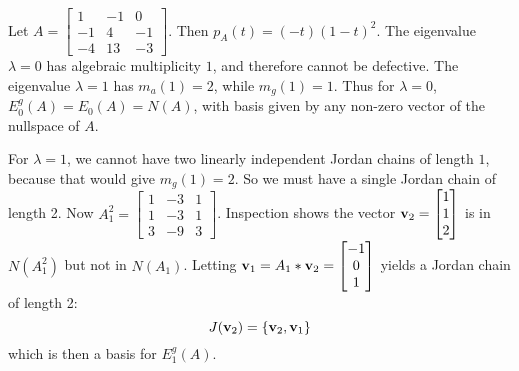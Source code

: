 \documentclass{ximera}
\begin{document}
\begin{example} Let $A = \begin{bmatrix} 1 & -1 & 0\\ -1 & 4 & -1\\ -4 & 13 & -3\end{bmatrix}$. Then $p_A(t) = (-t)(1-t)^2$. The eigenvalue $\lambda = 0$ has algebraic multiplicity $1$, and therefore cannot be defective. The eigenvalue $\lambda = 1$ has $m_a(1) = 2$, while $m_g(1) = 1$. Thus for $\lambda = 0$, $E^g_0(A) = E_0(A) = N(A)$, with basis given by any non-zero vector of the nullspace of $A$.

For $\lambda = 1$, we cannot have two linearly independent Jordan chains of length $1$, because that would give $m_g(1) = 2$. So we must have a single Jordan chain of length 2. Now $A_1^2 = \begin{bmatrix} 1 & -3 & 1\\ 1 & -3 & 1\\ 3 & -9 & 3\end{bmatrix}$. Inspection shows the vector ${\bf v}_2 = \begin{bmatrix} 1\\ 1\\ 2\end{bmatrix}$ is in $N(A_1^2)$ but not in $N(A_1)$. Letting ${\bf v}_1 = A_1*{\bf v}_2 = \begin{bmatrix} -1\\ 0\\ 1\end{bmatrix}$ yields a Jordan chain of length 2:
\[
J({\bf v}_2) = \{{\bf v}_2, {\bf v}_1\}
\]
which is then a basis for $E_1^g(A)$.
\end{example}
\end{document}

